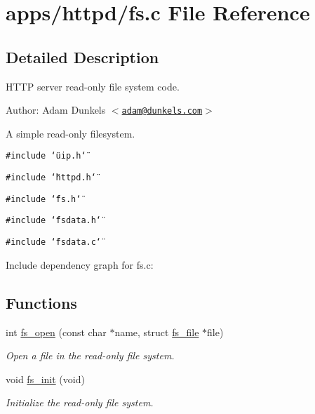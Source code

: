 \hypertarget{a00035}{
\section{apps/httpd/fs.c File Reference}
\label{a00035}
}


\subsection{Detailed Description}
HTTP server read-only file system code. 

\begin{Desc}
\item[Author:]Adam Dunkels $<$\href{mailto:adam@dunkels.com}{\tt adam@dunkels.com}$>$\end{Desc}
A simple read-only filesystem. 

{\tt \#include \char`\"{}uip.h\char`\"{}}\par
{\tt \#include \char`\"{}httpd.h\char`\"{}}\par
{\tt \#include \char`\"{}fs.h\char`\"{}}\par
{\tt \#include \char`\"{}fsdata.h\char`\"{}}\par
{\tt \#include \char`\"{}fsdata.c\char`\"{}}\par


Include dependency graph for fs.c:\subsection*{Functions}
\begin{CompactItemize}
\item 
int \hyperlink{a00082_g31dac76e56ce334835427efcfb58e2bd}{fs\_\-open} (const char $\ast$name, struct \hyperlink{a00026}{fs\_\-file} $\ast$file)
\begin{CompactList}\small\item\em Open a file in the read-only file system. \item\end{CompactList}\item 
\hypertarget{a00082_ge9386973b39dad27b36dc6262ec4d6b9}{
void \hyperlink{a00082_ge9386973b39dad27b36dc6262ec4d6b9}{fs\_\-init} (void)}
\label{a00082_ge9386973b39dad27b36dc6262ec4d6b9}

\begin{CompactList}\small\item\em Initialize the read-only file system. \item\end{CompactList}\end{CompactItemize}
